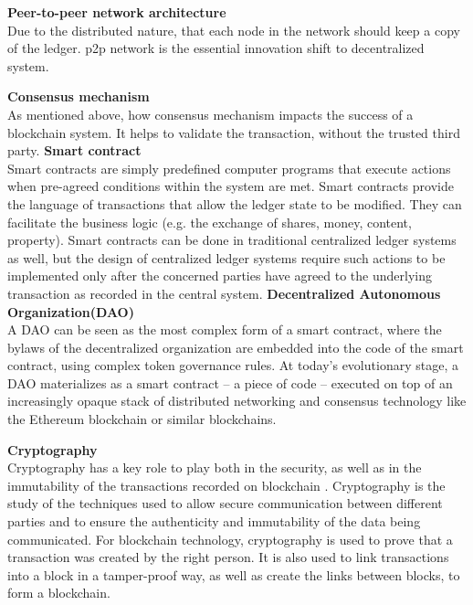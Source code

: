 \begin{outline}
	\1 \textbf{Peer-to-peer network architecture}\\
	Due to the distributed nature, that each node in the network should keep a copy of the ledger. p2p network is the essential innovation shift to decentralized system.
	
    \1 \textbf{Consensus mechanism}\\
	As mentioned above, how consensus mechanism impacts the success of a blockchain system. It helps to validate the transaction, without the trusted third party.
	\1 \textbf{Smart contract}\\
	Smart contracts are simply predefined computer programs that execute actions when pre-agreed conditions within the system are met. Smart contracts provide the language of transactions that allow the ledger state to be modified. They can facilitate the business logic (e.g.  the exchange of shares, money, content, property). Smart contracts can be done in traditional centralized ledger systems as well, but the design of centralized ledger systems require such actions to be implemented only after the concerned parties have agreed to the underlying transaction as recorded in the central system.
		\2 \textbf{Decentralized Autonomous Organization(DAO)}\\
		A DAO can be seen as the most complex form of a smart contract, where the bylaws of the decentralized organization are embedded into the code of the smart contract, using complex token governance rules. At today’s evolutionary stage, a DAO materializes as a smart contract – a piece of code – executed on top of an increasingly opaque stack of distributed networking and consensus technology like the Ethereum blockchain or similar blockchains.\cite{dao}
	
	\1 \textbf{Cryptography}\\
	Cryptography has a key role to play both in the security, as well as in the immutability of the transactions recorded on blockchain . Cryptography is the study of the techniques used to allow secure communication between different parties and to ensure the authenticity and immutability of the data being communicated. For blockchain technology, cryptography is used to prove that a transaction was created by the right person. It is also used to link transactions into a block in a tamper-proof way, as well as create the links between blocks, to form a blockchain.
	
	
\end{outline}

